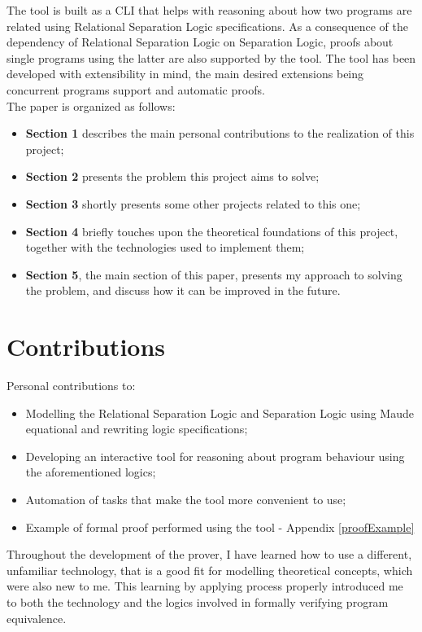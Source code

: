 \documentclass[12pt,a4paper]{article}
\begin{document}
The tool is built as a CLI that helps with reasoning about how two programs are related using Relational Separation Logic specifications. As a consequence of the dependency of Relational Separation Logic on Separation Logic, proofs about single programs using the latter are also supported by the tool. The tool has been developed with extensibility in mind, the main desired extensions being concurrent programs support and automatic proofs. \\

The paper is organized as follows: 
\begin{itemize}
	\item {\textbf{Section 1} describes the main personal contributions to the realization of this project;}
	\item {\textbf{Section 2} presents the problem this project aims to solve;}
	\item {\textbf{Section 3} shortly presents some other projects related to this one;}
	\item {\textbf{Section 4} briefly touches upon the theoretical foundations of this project, together with the technologies used to implement them;}
	\item {\textbf{Section 5}, the main section of this paper, presents my approach to solving the problem, and discuss how it can be improved in the future.}
\end{itemize}
\section{Contributions}
Personal contributions to:
\begin{itemize}
	\item Modelling the Relational Separation Logic and Separation Logic using Maude equational and rewriting logic specifications; 
	\item Developing an interactive tool for reasoning about program behaviour using the aforementioned logics;
	\item Automation of tasks that make the tool more convenient to use;
	\item Example of formal proof performed using the tool - Appendix \ref{proofExample}
\end{itemize}
Throughout the development of the prover, I have learned how to use a different, unfamiliar technology, that is a good fit for  modelling theoretical concepts, which were also new to me. This learning by applying process properly introduced me to both the technology and the logics involved in formally verifying program equivalence. 
\end{document}
